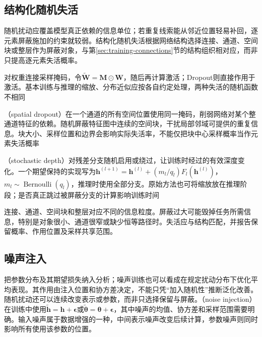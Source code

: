 \subsection{结构化随机失活}
\label{sec:generalization-structured-dropout}

随机扰动应覆盖模型真正依赖的信息单位；若重复线索能从邻近位置轻易补回，逐元素屏蔽施加的约束就较弱。结构化随机失活根据网络结构选择连接、通道、空间块或整层作为屏蔽对象，与第\ref{sec:training-connections}节的结构组织相对应，而非只提高逐元素失活概率。

对权重连接采样掩码，令$\tilde{\bm W}=\bm M\odot\bm W$，随后再计算激活；Dropout则直接作用于激活。基本训练与推理的缩放、分布近似应按各自约定处理，两种失活的随机函数不相同

（spatial dropout）在一个通道的所有空间位置使用同一掩码，削弱网络对某个整通道特征的依赖。随机屏蔽特征图中连续的空间块，干扰局部邻域可提供的重复信息。块大小、采样位置和边界会影响实际失活率，不能仅把块中心采样概率当作元素失活概率

（stochastic depth）对残差分支随机启用或绕过，让训练时经过的有效深度变化。一个期望保持的实现写为$\bm h^{(l+1)}=\bm h^{(l)}+(m_l/q_l)F_l(\bm h^{(l)})$，$m_l\sim\operatorname{Bernoulli}(q_l)$，推理时使用全部分支。原始方法也可将缩放放在推理阶段；是否真正跳过被屏蔽分支的计算影响训练时间

连接、通道、空间块和整层对应不同的信息粒度。屏蔽过大可能毁掉任务所需信息，特别是对象很小、通道很窄或缺少恒等路径时。失活应与结构匹配，并报告保留概率、作用位置及采样共享范围。

\subsection{噪声注入}
\label{sec:generalization-noise}

把参数分布及其期望损失纳入分析；噪声训练也可以看成在规定扰动分布下优化平均表现。其作用由注入位置和协方差决定，不能只凭“加入随机性”推断泛化改善。随机扰动还可以连续改变表示或参数，而非只选择保留与屏蔽。（noise injection）在训练中使用$\tilde{\bm h}=\bm h+\bm\epsilon$或$\tilde{\bm\theta}=\bm\theta+\bm\epsilon$，其中噪声的均值、协方差和采样范围需要明确。输入噪声属于数据增强的一种，中间表示噪声改变后续计算，参数噪声则同时影响所有使用该参数的位置。

